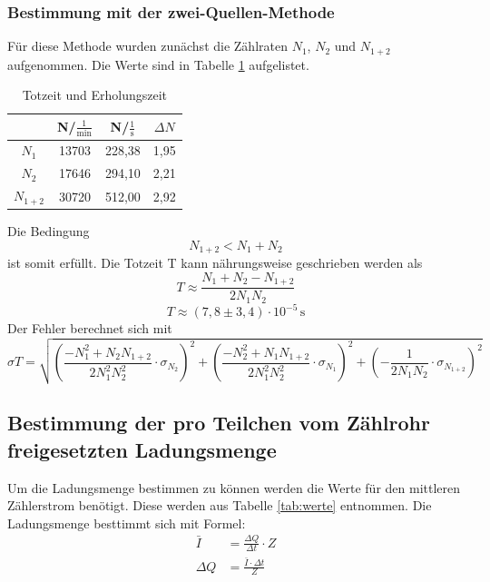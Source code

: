 \subsubsection{Bestimmung mit der zwei-Quellen-Methode}
Für diese Methode wurden zunächst die Zählraten $N_1$, $N_2$ und $N_{1+2}$ aufgenommen.
Die Werte sind in Tabelle \ref{tab:zähl} aufgelistet.
\begin{table}
\centering
\caption{Totzeit und Erholungszeit}
\label{tab:zähl}
\begin{tabular}{c c c c}
\toprule
{} & {N/$\mathrm{\frac{1}{min}}$} & {N/$\mathrm{\frac{1}{s}}$} & {$\Delta N$}\\
\midrule
 $N_1$    & 13703 & 228,38  & 1,95 \\
$N_2$     & 17646 & 294,10  & 2,21 \\
$N_{1+2}$ & 30720 & 512,00   & 2,92 \\
\bottomrule
\end{tabular}
\end{table}
Die Bedingung
\begin{equation*}
  N_{1+2} < N_1 + N_2
\end{equation*}
ist somit erfüllt.
Die Totzeit T kann nährungsweise geschrieben werden als
\begin{equation*}
  T \approx  \frac{N_1 +N_2 -N_{1+2}}{2N_1N_2}
\end{equation*}
\begin{equation*}
  T \approx (7,8\pm 3,4)\cdot 10^{-5} \, \mathrm{s}
\end{equation*}
Der Fehler berechnet sich mit
\begin{equation*}
  \sigma T = \sqrt{\left(\frac{-N_1^2+N_2N_{1+2}}{2N_1^2N_2^2}\cdot\sigma_{N_2}\right)^2+
  \left(\frac{-N_2^2+N_1N_{1+2}}{2N_1^2N_2^2}\cdot\sigma_{N_1}\right)^2+
  \left(-\frac{1}{2N_1N_2}\cdot\sigma_{N_{1+2}}\right)^2}
\end{equation*}

\subsection{Bestimmung der pro Teilchen vom Zählrohr freigesetzten Ladungsmenge }

Um die Ladungsmenge bestimmen zu können werden die Werte für den mittleren Zählerstrom benötigt.
Diese werden aus Tabelle \ref{tab:werte} entnommen.
Die Ladungsmenge besttimmt sich mit Formel:
\begin{align*}
  \bar{I} &= \frac{\Delta Q}{\Delta t}\cdot Z \\
  \Delta{Q} &= \frac{\bar{I}\cdot \Delta t}{Z}
\end{align*}


